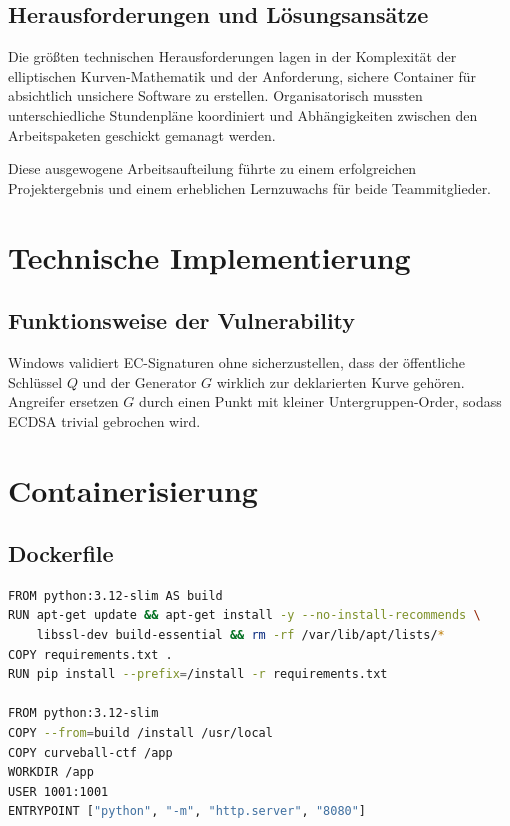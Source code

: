 \documentclass{article}
\begin{document}
\subsection{Herausforderungen und Lösungsansätze}

\noindent Die größten technischen Herausforderungen lagen in der Komplexität der elliptischen Kurven-Mathematik und der Anforderung, sichere Container für absichtlich unsichere Software zu erstellen. Organisatorisch mussten unterschiedliche Stundenpläne koordiniert und Abhängigkeiten zwischen den Arbeitspaketen geschickt gemanagt werden.

\noindent Diese ausgewogene Arbeitsaufteilung führte zu einem erfolgreichen Projektergebnis und einem erheblichen Lernzuwachs für beide Teammitglieder.

\section{Technische Implementierung}



\subsection{Funktionsweise der Vulnerability}
Windows validiert EC-Signaturen ohne sicherzustellen, dass der
öffentliche Schlüssel \(Q\) und der Generator \(G\) wirklich
zur deklarierten Kurve gehören.
Angreifer ersetzen \(G\) durch einen Punkt mit
kleiner Untergruppen-Order, sodass
ECDSA trivial gebrochen wird.

\section{Containerisierung}
\subsection{Dockerfile}
\begin{lstlisting}[language=bash,caption={Auszug aus dem finalen Dockerfile}]
FROM python:3.12-slim AS build
RUN apt-get update && apt-get install -y --no-install-recommends \
    libssl-dev build-essential && rm -rf /var/lib/apt/lists/*
COPY requirements.txt .
RUN pip install --prefix=/install -r requirements.txt

FROM python:3.12-slim
COPY --from=build /install /usr/local
COPY curveball-ctf /app
WORKDIR /app
USER 1001:1001
ENTRYPOINT ["python", "-m", "http.server", "8080"]
\end{lstlisting}
\end{document}
